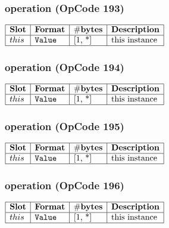 \subsubsection{ operation (OpCode 193)}

\noindent
\(\begin{array}{| l | l | l | l |}
    \hline
    \bf{Slot} & \bf{Format} & \bf{\#bytes} & \bf{Description} \\
    \hline
         this & \lst{Value} & \text{[1, *]} & \text{this instance} \\
    \hline
      
\end{array}\)
       

\subsubsection{ operation (OpCode 194)}

\noindent
\(\begin{array}{| l | l | l | l |}
    \hline
    \bf{Slot} & \bf{Format} & \bf{\#bytes} & \bf{Description} \\
    \hline
         this & \lst{Value} & \text{[1, *]} & \text{this instance} \\
    \hline
      
\end{array}\)
       

\subsubsection{ operation (OpCode 195)}

\noindent
\(\begin{array}{| l | l | l | l |}
    \hline
    \bf{Slot} & \bf{Format} & \bf{\#bytes} & \bf{Description} \\
    \hline
         this & \lst{Value} & \text{[1, *]} & \text{this instance} \\
    \hline
      
\end{array}\)
       

\subsubsection{ operation (OpCode 196)}

\noindent
\(\begin{array}{| l | l | l | l |}
    \hline
    \bf{Slot} & \bf{Format} & \bf{\#bytes} & \bf{Description} \\
    \hline
         this & \lst{Value} & \text{[1, *]} & \text{this instance} \\
    \hline
      
\end{array}\)
       

